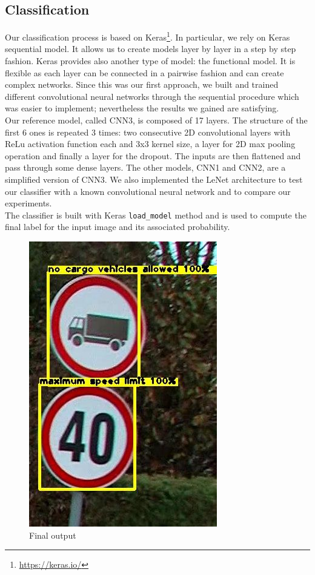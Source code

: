\documentclass[10pt,twocolumn,letterpaper]{article}
\begin{document}
\subsection{Classification}
Our classification process is based on Keras\footnote{\url{https://keras.io/}}. In particular, we rely on Keras sequential model. It allows us to create models layer by layer in a step by step fashion. Keras provides also another type of model: the functional model. It is flexible as each layer can be connected in a pairwise fashion and can create complex networks. Since this was our first approach, we built and trained different convolutional neural networks through the sequential procedure which was easier to implement; nevertheless the results we gained are satisfying.\\
Our reference model, called CNN3, is composed of 17 layers. The structure of the first 6 ones is repeated 3 times: two consecutive 2D convolutional layers with ReLu activation function each and $3$x$3$ kernel size, a layer for 2D max pooling operation and finally a layer for the dropout. The inputs are then flattened and pass through some dense layers. The other models, CNN1 and CNN2, are a simplified version of CNN3. We also implemented the LeNet architecture to test our classifier with a known convolutional neural network and to compare our experiments.\\
The classifier is built with Keras \texttt{load\_model} method and is used to compute the final label for the input image and its associated probability.
\begin{figure}[h]
	\centering\includegraphics[scale=0.5]{Res/Immagini/classExample.jpg}	
	\caption{Final output}
\end{figure}
\end{document}
